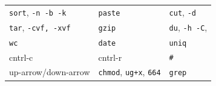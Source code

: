 \documentclass[]{krantz}
\begin{document}
\begin{longtable}[]{@{}lll@{}}
\begin{minipage}[t]{0.34\columnwidth}
\texttt{sort}, \texttt{-n\ -b\ -k}\strut
\end{minipage} & \begin{minipage}[t]{0.35\columnwidth}\raggedright
\texttt{paste}\strut
\end{minipage} & \begin{minipage}[t]{0.22\columnwidth}\raggedright
\texttt{cut}, \texttt{-d}\strut
\end{minipage}\tabularnewline
\begin{minipage}[t]{0.34\columnwidth}\raggedright
\texttt{tar}, \texttt{-cvf,\ -xvf}\strut
\end{minipage} & \begin{minipage}[t]{0.35\columnwidth}\raggedright
\texttt{gzip}\strut
\end{minipage} & \begin{minipage}[t]{0.22\columnwidth}\raggedright
\texttt{du}, \texttt{-h\ -C},\strut
\end{minipage}\tabularnewline
\begin{minipage}[t]{0.34\columnwidth}\raggedright
\texttt{wc}\strut
\end{minipage} & \begin{minipage}[t]{0.35\columnwidth}\raggedright
\texttt{date}\strut
\end{minipage} & \begin{minipage}[t]{0.22\columnwidth}\raggedright
\texttt{uniq}\strut
\end{minipage}\tabularnewline
\begin{minipage}[t]{0.34\columnwidth}\raggedright
cntrl-c\strut
\end{minipage} & \begin{minipage}[t]{0.35\columnwidth}\raggedright
cntrl-r\strut
\end{minipage} & \begin{minipage}[t]{0.22\columnwidth}\raggedright
\texttt{\#}\strut
\end{minipage}\tabularnewline
\begin{minipage}[t]{0.34\columnwidth}\raggedright
up-arrow/down-arrow\strut
\end{minipage} & \begin{minipage}[t]{0.35\columnwidth}\raggedright
\texttt{chmod}, \texttt{ug+x}, \texttt{664}\strut
\end{minipage} & \begin{minipage}[t]{0.22\columnwidth}\raggedright
\texttt{grep}\strut
\end{minipage}\tabularnewline
\bottomrule
\end{longtable}
\end{document}
